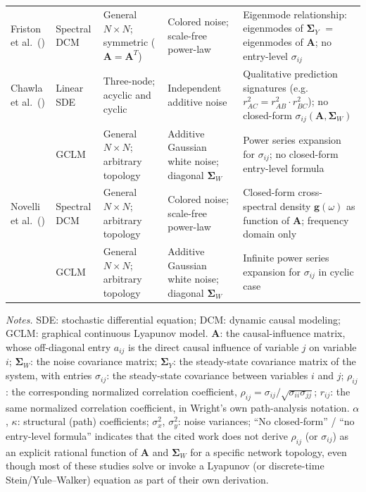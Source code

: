 \documentclass{article}
\begin{document}
\begin{table}[H]
\begin{tabular}{p{1.8cm} p{2.0cm} p{2.6cm} p{3.0cm} p{4.8cm}}
Friston et al.\ (\citeyear{Friston2014}) &
Spectral DCM &
General $N\times N$; symmetric
($\mathbf{A}=\mathbf{A}^T$) &
Colored noise; scale-free power-law &
Eigenmode relationship: eigenmodes of
$\boldsymbol{\Sigma}_Y$ $=$ eigenmodes of $\mathbf{A}$;
no entry-level $\sigma_{ij}$ \\

Chawla et al.\ (\citeyear{ChawlaEtAl2018}) &
Linear SDE &
Three-node; acyclic and cyclic &
Independent additive noise &
Qualitative prediction signatures
(e.g.\ $r_{AC}^2 = r_{AB}^2 \cdot r_{BC}^2$);
no closed-form $\sigma_{ij}(\mathbf{A},
\boldsymbol{\Sigma}_W)$ \\

\citet{VarandoHansen2020} &
GCLM &
General $N\times N$; arbitrary topology &
Additive Gaussian white noise; diagonal
$\boldsymbol{\Sigma}_W$ &
Power series expansion for $\sigma_{ij}$;
no closed-form entry-level formula \\

Novelli et al.\ (\citeyear{NovelliRazi2024}) &
Spectral DCM &
General $N\times N$; arbitrary topology &
Colored noise; scale-free power-law &
Closed-form cross-spectral density $\mathbf{g}(\omega)$
as function of $\mathbf{A}$; frequency domain only \\

\citet{HansenTrek2025} &
GCLM &
General $N\times N$; arbitrary topology &
Additive Gaussian white noise; diagonal
$\boldsymbol{\Sigma}_W$ &
Infinite power series expansion for $\sigma_{ij}$
in cyclic case \\
\hline
\end{tabular}

\medskip
\begin{minipage}{\textwidth}
\noindent\textit{Notes.} SDE: stochastic differential equation;
DCM: dynamic causal modeling; GCLM: graphical continuous
Lyapunov model.
$\mathbf{A}$: the causal-influence matrix, whose off-diagonal
entry $a_{ij}$ is the direct causal influence of variable $j$ on
variable $i$; $\boldsymbol{\Sigma}_W$: the noise covariance
matrix; $\boldsymbol{\Sigma}_Y$: the steady-state covariance
matrix of the system, with entries $\sigma_{ij}$: the
steady-state covariance between variables $i$ and $j$;
$\rho_{ij}$: the corresponding normalized correlation
coefficient, $\rho_{ij}=\sigma_{ij}/\sqrt{\sigma_{ii}\sigma_{jj}}$;
$r_{ij}$: the same normalized correlation coefficient, in
Wright's own path-analysis notation.
$\alpha$, $\kappa$: structural (path) coefficients;
$\sigma_x^2$, $\sigma_y^2$: noise variances;
``No closed-form'' / ``no entry-level formula'' indicates that
the cited work does not derive $\rho_{ij}$ (or $\sigma_{ij}$)
as an explicit rational function of $\mathbf{A}$ and
$\boldsymbol{\Sigma}_W$ for a specific network topology, even
though most of these studies solve or invoke a Lyapunov (or
discrete-time Stein/Yule--Walker) equation as part of their own
derivation.
\end{minipage}
\end{table}

\clearpage


\end{document}
